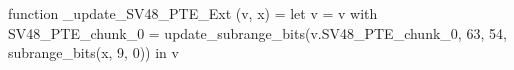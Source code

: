 function _update_SV48_PTE_Ext (v, x) = let v = { v with SV48_PTE_chunk_0 = update_subrange_bits(v.SV48_PTE_chunk_0, 63, 54, subrange_bits(x, 9, 0)) } in
  v

